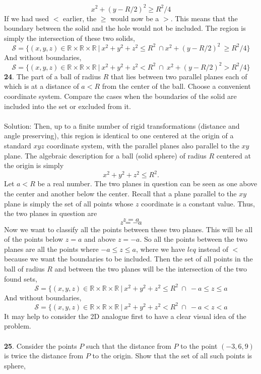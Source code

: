 \documentclass[12pt]{amsbook}
\begin{document}
$$x^2+(y-R/2)^2 \geq R^2/4$$
If we had used $<$ earlier, the $\geq$ would now be a $>$. This means that the boundary between the solid and the hole would not be included. The region is simply the intersection of these two solids,
$$\mathcal{S}=\{(x,y,z) \in \mathbb{R}\times \mathbb{R}\times \mathbb{R} \ | \  x^2+y^2+z^2 \leq R^2 \ \cap x^2+(y-R/2)^2 \ \geq R^2/4 \}$$
And without boundaries,
$$\mathcal{S}=\{(x,y,z) \in \mathbb{R}\times \mathbb{R}\times \mathbb{R} \ | \  x^2+y^2+z^2 < R^2 \ \cap \  x^2+(y-R/2)^2 > R^2/4 \}$$
{\small\bf 24}. The part of a ball of radius $R$ that
lies between two parallel planes each of which is at a distance of
$a<R$ from the center of the ball. Choose a convenient coordinate
system. Compare the cases
when the boundaries of the solid are included into the set
or excluded from it.\\
\\
{\sc Solution}:
Then, up to a finite number of rigid transformations (distance and angle preserving), this region is identical to one centered at the origin of a standard $xyz$ coordinate system, with the parallel planes also parallel to the $xy$ plane. The algebraic description for a ball (solid sphere) of radius $R$ centered at the origin is simply 
$$x^2+y^2+z^2 \leq R^2.$$
Let $a<R$ be a real number. The two planes in question can be seen as one above the center and another below the center. Recall that a plane parallel to the $xy$ plane is simply the set of all points whose $z$ coordinate is a constant value. Thus, the two planes in question are
$$z=a$$
$$z=-a$$
Now we want to classify all the points between these two planes. This will be all of the points below $z=a$ and above $z=-a$. So all the points between the two planes are all the points where $-a \leq z \leq a$, where we have $leq$ instead of $<$ because we want the boundaries to be included. Then the set of all points in the ball of radius $R$ and between the two planes will be the intersection of the two found sets,
$$\mathcal{S}= \{(x,y,z) \in \mathbb{R} \times \mathbb{R} \times \mathbb{R} \ | \ x^2+y^2+z^2 \leq R^2 \ \cap \ -a \leq z \leq a$$
And without boundaries,
$$\mathcal{S}= \{(x,y,z) \in \mathbb{R} \times \mathbb{R} \times \mathbb{R} \ | \ x^2+y^2+z^2 < R^2 \ \cap \ -a < z < a$$
It may help to consider the 2D analogue first to have a clear visual idea of the problem.
\\
\\
{\small\bf 25}. Consider the points $P$ such that the distance from
$P$ to the point $(-3,6,9)$ is twice the distance from $P$ to 
the origin. Show that the set of all such points is sphere,
\end{document}
